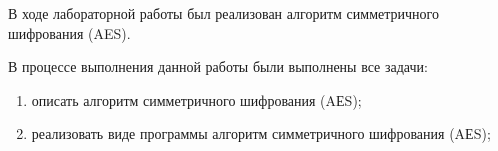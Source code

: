 
В ходе лабораторной работы был реализован алгоритм симметричного шифрования (AES).

В процессе выполнения данной работы были выполнены все задачи:
\begin{enumerate}[label={\arabic*)}]
	\item описать алгоритм симметричного шифрования (AЕS);
	\item реализовать виде программы алгоритм симметричного шифрования (AЕS);
\end{enumerate}
